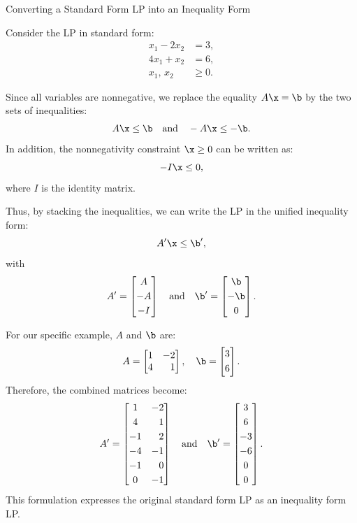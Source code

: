 \begin{example}{Converting a Standard Form LP into an Inequality Form}{}


Consider the LP in standard form:
\[
\begin{aligned}
x_1 - 2x_2 &= 3,\\[1mm]
4x_1 + x_2 &= 6,\\[1mm]
x_1,\,x_2 &\ge 0.
\end{aligned}
\]

Since all variables are nonnegative, we replace the equality \(A\x = \b\) by the two sets of inequalities:
\[
A\x \le\b\quad \text{and} \quad -A\x \le -\b.
\]
In addition, the nonnegativity constraint \(\x \ge 0\) can be written as:
\[
-I\x \le 0,
\]
where \(I\) is the identity matrix.

Thus, by stacking the inequalities, we can write the LP in the unified inequality form:
\[
A'\x \le \b',
\]
with
\[
A' = \begin{bmatrix}
A \\[1mm]
-A \\[1mm]
-I
\end{bmatrix}
\quad \text{and} \quad
\b' = \begin{bmatrix}
\b \\[1mm]
-\b \\[1mm]
0
\end{bmatrix}.
\]

For our specific example, \(A\) and \(\b\) are:
\[
A = \begin{bmatrix}
1 & -2 \\
4 & \phantom{-}1
\end{bmatrix}, \quad
\b = \begin{bmatrix}
3 \\[1mm]
6
\end{bmatrix}.
\]
Therefore, the combined matrices become:
\[
A' = \begin{bmatrix}
1 & -2 \\[1mm]
4 & \phantom{-}1 \\[1mm]
-1 & \phantom{-}2 \\[1mm]
-4 & -1 \\[1mm]
-1 & \phantom{-}0 \\[1mm]
0 & -1
\end{bmatrix}
\quad \text{and} \quad
\b' = \begin{bmatrix}
3 \\[1mm]
6 \\[1mm]
-3 \\[1mm]
-6 \\[1mm]
0 \\[1mm]
0
\end{bmatrix}.
\]
This formulation expresses the original standard form LP as an inequality form LP.
\end{example}

